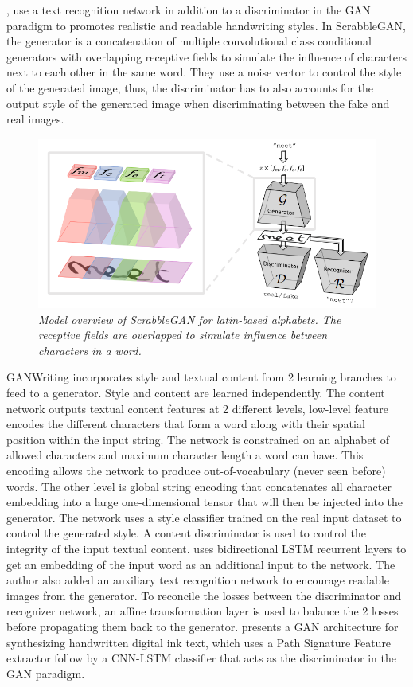 \documentclass[12pt]{report}
\begin{document}
\cite{scrabble-gan}, \cite{gan-writting} use a text recognition network in addition to a discriminator in the GAN paradigm to promotes realistic and readable handwriting styles. In ScrabbleGAN\cite{scrabble-gan}, the generator is a concatenation of multiple convolutional class conditional generators with overlapping receptive fields to simulate the influence of characters next to each other in the same word. They use a noise vector to control the style of the generated image, thus, the discriminator has to also accounts for the output style of the generated image when discriminating between the fake and real images.

\begin{figure}[h]
	\centering
	\includegraphics[scale=0.8]{scrabble-gan}
	\caption{\textit{Model overview of ScrabbleGAN \cite{scrabble-gan} for latin-based alphabets. The receptive fields are overlapped to simulate influence between characters in a word.}}
	\label{fig:scrabble-gan}
\end{figure}

GANWriting \cite{gan-writting} incorporates style and textual content from 2 learning branches to feed to a generator. Style and content are learned independently. The content network outputs textual content features at 2 different levels, low-level feature encodes the different characters that form a word along with their spatial position within the input string. The network is constrained on an alphabet of allowed characters and maximum character length a word can have. This encoding allows the network to produce out-of-vocabulary (never seen before) words. The other level is global string encoding that concatenates all character embedding into a large one-dimensional tensor that will then be injected into the generator.
The network uses a style classifier trained on the real input dataset to control the generated style. A content discriminator is used to control the integrity of the input textual content.
\cite{adversarial-gen} uses bidirectional LSTM recurrent layers \cite{lstm} to get an embedding of the input word as an additional input to the network. The author also added an auxiliary text recognition network to encourage readable images from the generator. To reconcile the losses between the discriminator and recognizer network, an affine transformation layer is used to balance the 2 losses before propagating them back to the generator.
\cite{hw-gan} presents a GAN architecture for synthesizing handwritten digital ink text, which uses a Path Signature Feature extractor follow by a CNN-LSTM classifier that acts as the discriminator in the GAN paradigm.
\end{document}
